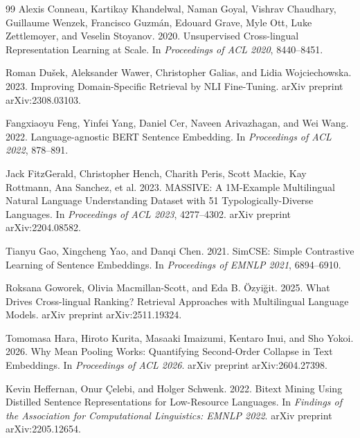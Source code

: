 \documentclass[manuscript]{acmart}
\begin{document}
\begin{thebibliography}{99}
Alexis Conneau, Kartikay Khandelwal, Naman Goyal, Vishrav Chaudhary, Guillaume Wenzek, Francisco Guzmán, Edouard Grave, Myle Ott, Luke Zettlemoyer, and Veselin Stoyanov. 2020.
\newblock Unsupervised Cross-lingual Representation Learning at Scale.
\newblock In \emph{Proceedings of ACL 2020}, 8440--8451.

Roman Dušek, Aleksander Wawer, Christopher Galias, and Lidia Wojciechowska. 2023.
\newblock Improving Domain-Specific Retrieval by NLI Fine-Tuning.
\newblock arXiv preprint arXiv:2308.03103.

Fangxiaoyu Feng, Yinfei Yang, Daniel Cer, Naveen Arivazhagan, and Wei Wang. 2022.
\newblock Language-agnostic BERT Sentence Embedding.
\newblock In \emph{Proceedings of ACL 2022}, 878--891.

Jack FitzGerald, Christopher Hench, Charith Peris, Scott Mackie, Kay Rottmann, Ana Sanchez, et al. 2023.
\newblock MASSIVE: A 1M-Example Multilingual Natural Language Understanding Dataset with 51 Typologically-Diverse Languages.
\newblock In \emph{Proceedings of ACL 2023}, 4277--4302. arXiv preprint arXiv:2204.08582.

Tianyu Gao, Xingcheng Yao, and Danqi Chen. 2021.
\newblock SimCSE: Simple Contrastive Learning of Sentence Embeddings.
\newblock In \emph{Proceedings of EMNLP 2021}, 6894--6910.

Roksana Goworek, Olivia Macmillan-Scott, and Eda B. Özyiğit. 2025.
\newblock What Drives Cross-lingual Ranking? Retrieval Approaches with Multilingual Language Models.
\newblock arXiv preprint arXiv:2511.19324.

Tomomasa Hara, Hiroto Kurita, Masaaki Imaizumi, Kentaro Inui, and Sho Yokoi. 2026.
\newblock Why Mean Pooling Works: Quantifying Second-Order Collapse in Text Embeddings.
\newblock In \emph{Proceedings of ACL 2026}. arXiv preprint arXiv:2604.27398.

Kevin Heffernan, Onur \c{C}elebi, and Holger Schwenk. 2022.
\newblock Bitext Mining Using Distilled Sentence Representations for Low-Resource Languages.
\newblock In \emph{Findings of the Association for Computational Linguistics: EMNLP 2022}. arXiv preprint arXiv:2205.12654.


\end{thebibliography}
\end{document}
